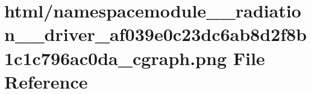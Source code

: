 \hypertarget{namespacemodule____radiation____driver__af039e0c23dc6ab8d2f8b1c1c796ac0da__cgraph_8png}{}\section{html/namespacemodule\+\_\+\+\_\+radiation\+\_\+\+\_\+driver\+\_\+af039e0c23dc6ab8d2f8b1c1c796ac0da\+\_\+cgraph.png File Reference}
\label{namespacemodule____radiation____driver__af039e0c23dc6ab8d2f8b1c1c796ac0da__cgraph_8png}
